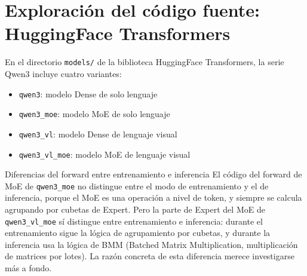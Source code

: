 \section{Exploración del código fuente: HuggingFace Transformers}

En el directorio \texttt{models/} de la biblioteca HuggingFace Transformers, la serie Qwen3 incluye cuatro variantes:
\begin{itemize}
  \item \texttt{qwen3}: modelo Dense de solo lenguaje
  \item \texttt{qwen3\_moe}: modelo MoE de solo lenguaje
  \item \texttt{qwen3\_vl}: modelo Dense de lenguaje visual
  \item \texttt{qwen3\_vl\_moe}: modelo MoE de lenguaje visual
\end{itemize}

\begin{knowledgebox}{Diferencias del forward entre entrenamiento e inferencia}
El código del forward de MoE de \texttt{qwen3\_moe} no distingue entre el modo de entrenamiento y el de inferencia, porque el MoE es una operación a nivel de token, y siempre se calcula agrupando por cubetas de Expert. Pero la parte de Expert del MoE de \texttt{qwen3\_vl\_moe} sí distingue entre entrenamiento e inferencia: durante el entrenamiento sigue la lógica de agrupamiento por cubetas, y durante la inferencia usa la lógica de BMM (Batched Matrix Multiplication, multiplicación de matrices por lotes). La razón concreta de esta diferencia merece investigarse más a fondo.
\end{knowledgebox}

